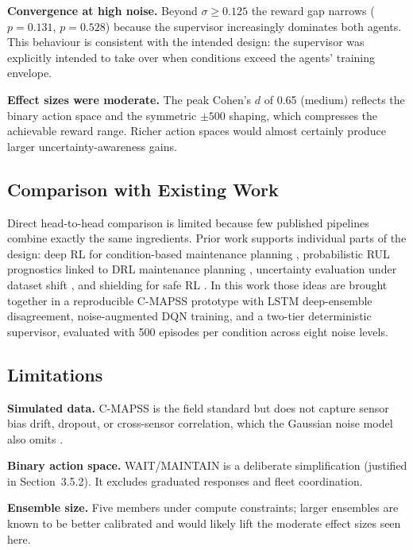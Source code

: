 \documentclass[12pt,a4paper]{report}
\begin{document}
\textbf{Convergence at high noise.} Beyond $\sigma \geq 0.125$ the reward gap narrows ($p = 0.131$, $p = 0.528$) because the supervisor increasingly dominates both agents. This behaviour is consistent with the intended design: the supervisor was explicitly intended to take over when conditions exceed the agents' training envelope.


\textbf{Effect sizes were moderate.} The peak Cohen's $d$ of 0.65 (medium) reflects the binary action space and the symmetric $\pm 500$ shaping, which compresses the achievable reward range. Richer action spaces would almost certainly produce larger uncertainty-awareness gains.



\subsection{Comparison with Existing Work}

Direct head-to-head comparison is limited because few published pipelines combine exactly the same ingredients. Prior work supports individual parts of the design: deep RL for condition-based maintenance planning \citep{zhang2019deep}, probabilistic RUL prognostics linked to DRL maintenance planning \citep{lee2023deep}, uncertainty evaluation under dataset shift \citep{ovadia2019can}, and shielding for safe RL \citep{alshiekh2018safe}. In this work those ideas are brought together in a reproducible C-MAPSS prototype with LSTM deep-ensemble disagreement, noise-augmented DQN training, and a two-tier deterministic supervisor, evaluated with 500 episodes per condition across eight noise levels.

\subsection{Limitations}

\textbf{Simulated data.} C-MAPSS \citep{saxena2008damage} is the field standard but does not capture sensor bias drift, dropout, or cross-sensor correlation, which the Gaussian noise model also omits \citep{ramasso2014review}.

\textbf{Binary action space.} WAIT/MAINTAIN is a deliberate simplification (justified in Section~3.5.2). It excludes graduated responses and fleet coordination.

\textbf{Ensemble size.} Five members under compute constraints; larger ensembles are known to be better calibrated \citep{lakshminarayanan2017simple} and would likely lift the moderate effect sizes seen here.
\end{document}
